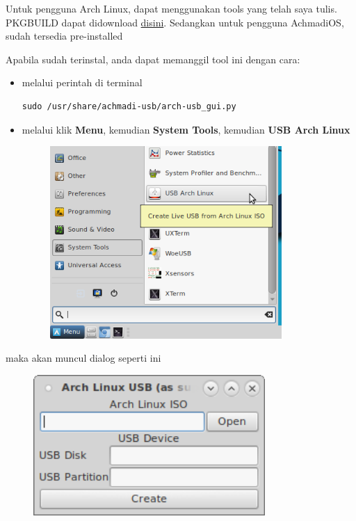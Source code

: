 \documentclass[12pt,]{article}
\begin{document}
	Untuk pengguna Arch Linux, dapat menggunakan tools yang telah saya tulis.
	PKGBUILD dapat didownload \href{https://github.com/mekatronik-achmadi/achmadi-usb/blob/master/PKGBUILD}{disini}.
	Sedangkan untuk pengguna AchmadiOS, sudah tersedia pre-installed
	
	Apabila sudah terinstal, anda dapat memanggil tool ini dengan cara:
	\begin{itemize}
		\item melalui perintah di terminal
		\begin{verbatim}
sudo /usr/share/achmadi-usb/arch-usb_gui.py
		\end{verbatim}
		
		\item melalui klik \textbf{Menu}, kemudian \textbf{System Tools}, kemudian \textbf{USB Arch Linux} 
		
		\begin{figure}[h]
			\centering
			\includegraphics[width=250pt]{usbarch/menu}
		\end{figure}
	\end{itemize}

	maka akan muncul dialog seperti ini
	
	\begin{figure}[h]
		\centering
		\includegraphics[width=250pt]{usbarch/dialog}
	\end{figure}
\end{document}
